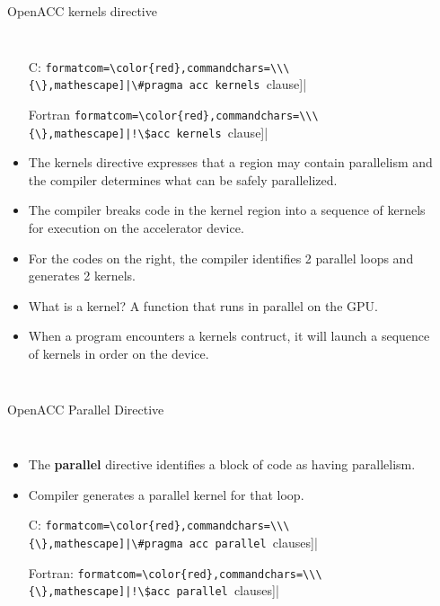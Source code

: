 \documentclass[c,mathserif,compress,xcolor=svgnames]{beamer}
\newcommand{\Verbred}[1]{\Verb[formatcom=\color{red},commandchars=\\\{\},mathescape]|#1|}
\newenvironment{eblock}[0]
{
\begin{beamerboxesrounded}[upper=uppercol2,lower=lowercol2,shadow=true]}
{\end{beamerboxesrounded}}
\begin{document}
\begin{frame}[fragile]{\small OpenACC kernels directive}
  \begin{columns}
    \begin{itemize}
      \item[C:] \Verbred{\#pragma acc kernels [clause]}
      \item[Fortran] \Verbred{!\$acc kernels [clause]}
      \item The kernels directive expresses that a region may contain parallelism and the compiler determines what can be safely parallelized.
      \item The compiler breaks code in the kernel region into a sequence of kernels for execution on the accelerator device.
      \item For the codes on the right, the compiler identifies 2 parallel loops and generates 2 kernels.
      \item {\color{red}What is a kernel?} {\color{DarkGreen}A function that runs in parallel on the GPU.}
      \item When a program encounters a kernels contruct, it will launch a sequence of kernels in order on the device.
    \end{itemize}
    \begin{eblock}{}
      
      
    \end{eblock}
  \end{columns}
\end{frame}

\begin{frame}[fragile]{\small OpenACC Parallel Directive}
  \begin{columns}
    \begin{itemize}
      \item The {\bf parallel} directive identifies a block of code as having parallelism.
      \item Compiler generates a parallel kernel for that loop.
      \item[C:] \Verbred{\#pragma acc parallel [clauses]}
      \item[Fortran:] \Verbred{!\$acc parallel [clauses]}
    \end{itemize}
    \begin{eblock}{}
      
      
    \end{eblock}
  \end{columns}
\end{frame}
\end{document}

